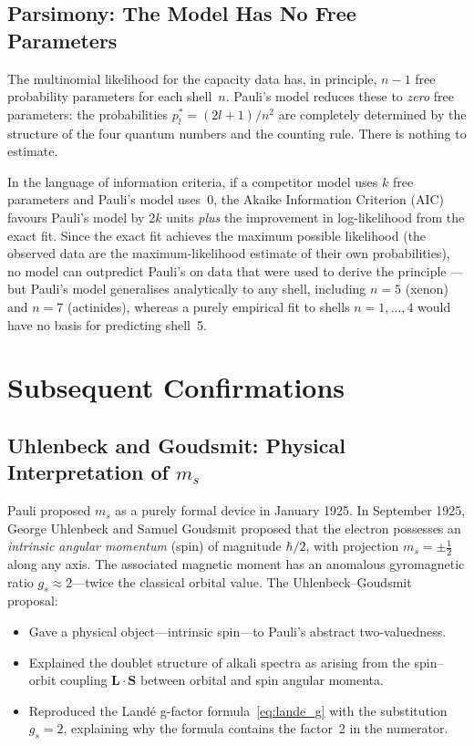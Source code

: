 \documentclass[12pt]{article}
\begin{document}
\subsection{Parsimony: The Model Has No Free Parameters}

The multinomial likelihood for the capacity data has, in principle, $n-1$
free probability parameters for each shell~$n$.  Pauli's model reduces these
to \emph{zero} free parameters: the probabilities $p_l^* = (2l+1)/n^2$ are
completely determined by the structure of the four quantum numbers and the
counting rule.  There is nothing to estimate.

In the language of information criteria, if a competitor model uses $k$ free
parameters and Pauli's model uses~0, the Akaike Information Criterion (AIC)
favours Pauli's model by $2k$ units \emph{plus} the improvement in
log-likelihood from the exact fit.  Since the exact fit achieves the maximum
possible likelihood (the observed data are the maximum-likelihood estimate
of their own probabilities), no model can outpredict Pauli's on data
that were used to derive the principle --- but Pauli's model generalises
analytically to any shell, including $n=5$ (xenon) and $n=7$ (actinides),
whereas a purely empirical fit to shells $n=1,\ldots,4$ would have no
basis for predicting shell~5.

\section{Subsequent Confirmations}
\label{sec:subsequent}

\subsection{Uhlenbeck and Goudsmit: Physical Interpretation of $m_s$}

Pauli proposed $m_s$ as a purely formal device in January 1925.  In
September 1925, George Uhlenbeck and Samuel Goudsmit
\citeyearpar{UhlenbeckGoudsmit1925} proposed that the electron possesses an
\emph{intrinsic angular momentum} (spin) of magnitude $\hbar/2$, with
projection $m_s = \pm\tfrac{1}{2}$ along any axis.  The associated magnetic
moment has an anomalous gyromagnetic ratio $g_s \approx 2$---twice the
classical orbital value.  The Uhlenbeck--Goudsmit proposal:
\begin{itemize}
  \item Gave a physical object---intrinsic spin---to Pauli's abstract
    two-valuedness.
  \item Explained the doublet structure of alkali spectra as arising from the
    spin--orbit coupling $\mathbf{L}\cdot\mathbf{S}$ between orbital and spin
    angular momenta.
  \item Reproduced the Landé g-factor formula~\eqref{eq:lande_g} with the
    substitution $g_s = 2$, explaining why the formula contains the factor~2
    in the numerator.
\end{itemize}
\end{document}
